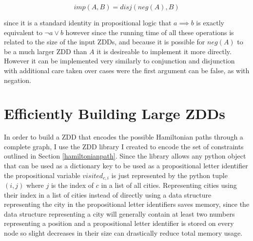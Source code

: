 \documentclass[12pt,a4paper,twoside,openright]{report}
\begin{document}
$$
\mathit{imp}(A, B) = \mathit{disj}(\mathit{neg}(A), B)
$$

since it is a standard identity in propositional logic that $a\implies b$ is exactly equivalent to $\neg a\vee b$ however since the running time of all these operations is related to the size of the input ZDDs, and because it is possible for $\mathit{neg}(A)$ to be a much larger ZDD than $A$ it is desireable to implement it more directly. However it can be implemented very similarly to conjunction and disjunction with additional care taken over cases were the first argument can be false, as with negation.

\section{Efficiently Building Large ZDDs}
In order to build a ZDD that encodes the possible Hamiltonian paths through a complete graph, I use the ZDD library I created to encode the set of constraints outlined in Section \ref{hamiltonianpath}. Since the library allows any python object that can be used as a dictionary key to be used as a propositional letter identifier the propositional variable $\mathit{visited}_{c,i}$ is just represented by the python tuple $(i, j)$ where $j$ is the index of $c$ in a list of all cities. Representing cities using their index in a list of cities instead of directly using a data structure representing the city in the propositional letter identifiers saves memory, since the data structure representing a city will generally contain at least two numbers representing a position and a propositional letter identifier is stored on every node so slight decreases in their size can drastically reduce total memory usage. 
\end{document}
